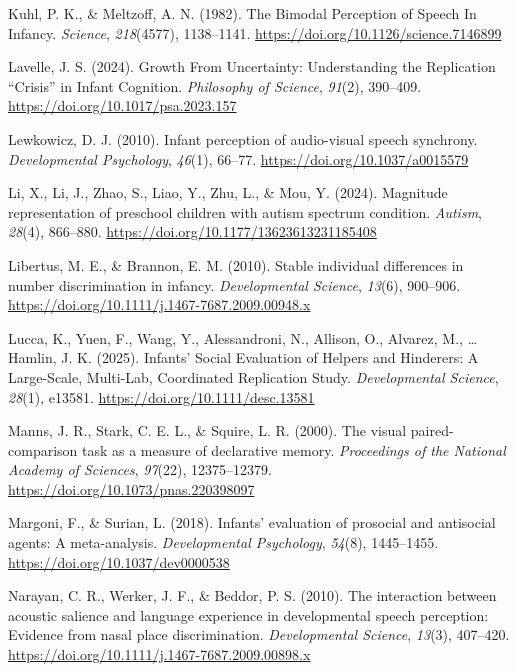 \documentclass[
  english,
  man,floatsintext]{apa6}
\newlength{\cslhangindent}
\newenvironment{CSLReferences}[2] %
 {\begin{list}{}{%
  \setlength{\itemindent}{0pt}
  \setlength{\leftmargin}{0pt}
  \setlength{\parsep}{0pt}
  \ifodd #1
   \setlength{\leftmargin}{\cslhangindent}
   \setlength{\itemindent}{-1\cslhangindent}
  \fi
  \setlength{\itemsep}{#2\baselineskip}}}
 {\end{list}}
\begin{document}
\begin{CSLReferences}{1}{0}
Kuhl, P. K., \& Meltzoff, A. N. (1982). The {Bimodal Perception} of {Speech In Infancy}. \emph{Science}, \emph{218}(4577), 1138--1141. \url{https://doi.org/10.1126/science.7146899}

Lavelle, J. S. (2024). Growth {From Uncertainty}: {Understanding} the {Replication} {``{Crisis}''} in {Infant Cognition}. \emph{Philosophy of Science}, \emph{91}(2), 390--409. \url{https://doi.org/10.1017/psa.2023.157}

Lewkowicz, D. J. (2010). Infant perception of audio-visual speech synchrony. \emph{Developmental Psychology}, \emph{46}(1), 66--77. \url{https://doi.org/10.1037/a0015579}

Li, X., Li, J., Zhao, S., Liao, Y., Zhu, L., \& Mou, Y. (2024). Magnitude representation of preschool children with autism spectrum condition. \emph{Autism}, \emph{28}(4), 866--880. \url{https://doi.org/10.1177/13623613231185408}

Libertus, M. E., \& Brannon, E. M. (2010). Stable individual differences in number discrimination in infancy. \emph{Developmental Science}, \emph{13}(6), 900--906. \url{https://doi.org/10.1111/j.1467-7687.2009.00948.x}

Lucca, K., Yuen, F., Wang, Y., Alessandroni, N., Allison, O., Alvarez, M., \ldots{} Hamlin, J. K. (2025). Infants' {Social Evaluation} of {Helpers} and {Hinderers}: {A Large-Scale}, {Multi-Lab}, {Coordinated Replication Study}. \emph{Developmental Science}, \emph{28}(1), e13581. \url{https://doi.org/10.1111/desc.13581}

Manns, J. R., Stark, C. E. L., \& Squire, L. R. (2000). The visual paired-comparison task as a measure of declarative memory. \emph{Proceedings of the National Academy of Sciences}, \emph{97}(22), 12375--12379. \url{https://doi.org/10.1073/pnas.220398097}

Margoni, F., \& Surian, L. (2018). Infants' evaluation of prosocial and antisocial agents: {A} meta-analysis. \emph{Developmental Psychology}, \emph{54}(8), 1445--1455. \url{https://doi.org/10.1037/dev0000538}

Narayan, C. R., Werker, J. F., \& Beddor, P. S. (2010). The interaction between acoustic salience and language experience in developmental speech perception: Evidence from nasal place discrimination. \emph{Developmental Science}, \emph{13}(3), 407--420. \url{https://doi.org/10.1111/j.1467-7687.2009.00898.x}


\end{CSLReferences}
\end{document}
